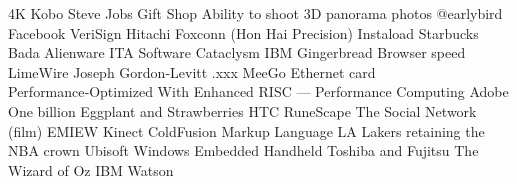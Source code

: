 \answerkey
{} 4K
 Kobo
 Steve Jobs
 Gift Shop
 Ability to shoot 3D panorama photos
 @earlybird
 Facebook
 VeriSign
 Hitachi
 Foxconn (Hon Hai Precision)
 Instaload
 Starbucks
 Bada
 Alienware
 ITA Software
 Cataclysm
 IBM
 Gingerbread
 Browser speed
 LimeWire
 Joseph Gordon‑Levitt
 .xxx
 MeeGo
 Ethernet card
 Performance‑Optimized With Enhanced RISC — Performance Computing
 Adobe
 One billion
 Eggplant and Strawberries
 HTC
 RuneScape
 The Social Network (film)
 EMIEW
 Kinect
 ColdFusion Markup Language
 LA Lakers retaining the NBA crown
 Ubisoft
 Windows Embedded Handheld
 Toshiba and Fujitsu
 The Wizard of Oz
 IBM Watson
\endanswerkey